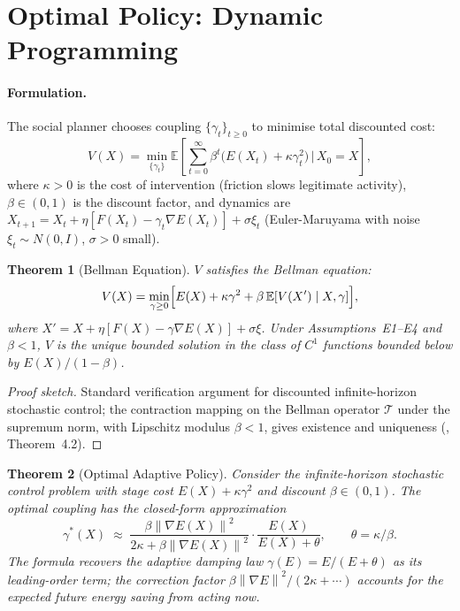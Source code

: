 \documentclass[11pt]{article}
\newtheorem{theorem}{Theorem}[section]
\theoremstyle{definition}
\newcommand{\E}{\mathbb{E}}
\newcommand{\grad}{\nabla}
\newcommand{\norm}[1]{\left\|#1\right\|}
\begin{document}
\section{Optimal Policy: Dynamic Programming}
\label{sec:policy}

\paragraph{Formulation.}
The social planner chooses coupling $\{\gamma_t\}_{t\ge 0}$ to minimise total
discounted cost:
\begin{equation}\label{eq:dp}
  V(X) = \min_{\{\gamma_t\}} \E\!\left[\sum_{t=0}^\infty \beta^t
         \bigl(E(X_t) + \kappa\gamma_t^2\bigr)\,\Big|\, X_0 = X\right],
\end{equation}
where $\kappa > 0$ is the cost of intervention (friction slows legitimate activity),
$\beta \in (0,1)$ is the discount factor, and dynamics are
$X_{t+1} = X_t + \eta[F(X_t) - \gamma_t\grad E(X_t)] + \sigma\xi_t$
(Euler-Maruyama with noise $\xi_t \sim N(0,I)$, $\sigma > 0$ small).

\begin{theorem}[Bellman Equation]
\label{thm:or1}
$V$ satisfies the Bellman equation:
\begin{equation}\label{eq:bellman}
  V(X) = \min_{\gamma \ge 0}
  \Bigl[E(X) + \kappa\gamma^2 + \beta\,\E[V(X')\mid X, \gamma]\Bigr],
\end{equation}
where $X' = X + \eta[F(X) - \gamma\grad E(X)] + \sigma\xi$.
Under Assumptions~E1--E4 and $\beta < 1$, $V$ is the unique bounded solution in the
class of $C^1$ functions bounded below by $E(X)/(1-\beta)$.
\end{theorem}

\begin{proof}[Proof sketch]
Standard verification argument for discounted infinite-horizon stochastic control;
the contraction mapping on the Bellman operator $\mathcal{T}$ under the supremum
norm, with Lipschitz modulus $\beta < 1$, gives existence and uniqueness
(\citealt{bertsekas2012dynamic}, Theorem~4.2).
\end{proof}

\begin{theorem}[Optimal Adaptive Policy]
\label{thm:or2}
Consider the infinite-horizon stochastic control problem with stage cost
$E(X) + \kappa\gamma^2$ and discount $\beta\in(0,1)$.  The optimal coupling
has the closed-form approximation
\[
  \gamma^*(X)
  \;\approx\;
  \frac{\beta\norm{\grad E(X)}^2}{2\kappa + \beta\norm{\grad E(X)}^2}
  \cdot
  \frac{E(X)}{E(X) + \theta},
  \qquad
  \theta = \kappa/\beta.
\]
The formula recovers the adaptive damping law $\gamma(E) = E/(E+\theta)$ as its
leading-order term; the correction factor $\beta\norm{\grad E}^2/(2\kappa+\cdots)$
accounts for the expected future energy saving from acting now.
\end{theorem}
\end{document}
